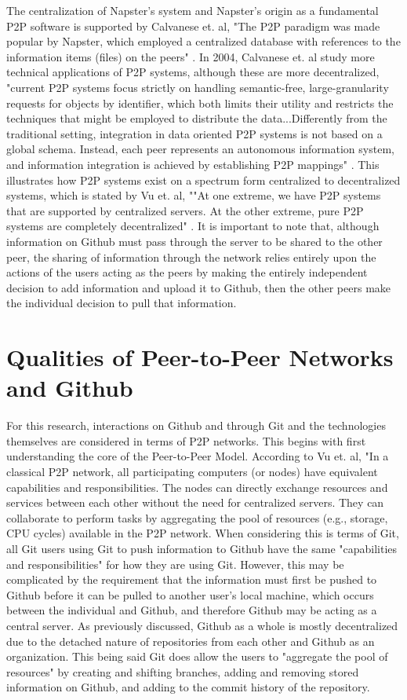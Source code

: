 The centralization of Napster's system and Napster's origin as a fundamental P2P software is supported by Calvanese et. al, "The P2P paradigm was made popular by Napster, which employed a centralized database with references to the information items (files) on the peers" \cite{calvanese2004logical}. In 2004, Calvanese et. al study more technical applications of P2P systems, although these are more decentralized, "current P2P systems focus strictly
on handling semantic-free, large-granularity requests for objects by identifier, which both limits their utility and restricts the techniques that might be employed to distribute the data...Differently from the traditional setting, integration in data oriented P2P systems is not based on a global schema. Instead, each peer represents an autonomous information system, and information integration is achieved by establishing P2P mappings" \cite{calvanese2004logical}. This illustrates how P2P systems exist on a spectrum form centralized to decentralized systems, which is stated by Vu et. al, ""At one extreme, we have P2P systems that are supported by centralized servers. At the other extreme, pure P2P systems are completely decentralized" \cite{peertopeercomputing}. It is important to note that, although information on Github must pass through the server to be shared to the other peer, the sharing of information through the network relies entirely upon the actions of the users acting as the peers by making the entirely independent decision to add information and upload it to Github, then the other peers make the individual decision to pull that information. 

\section{Qualities of Peer-to-Peer Networks and Github}

For this research, interactions on Github and through Git and the technologies themselves are considered in terms of P2P networks. This begins with first understanding the core of the Peer-to-Peer Model. According to Vu et. al, "In a classical P2P network, all
participating computers (or nodes) have equivalent capabilities and responsibilities.
The nodes can directly exchange resources and services between each other without
the need for centralized servers. They can collaborate to perform tasks by aggregating the pool of resources (e.g., storage, CPU cycles) available in the P2P network\cite{peertopeercomputing}. When considering this is terms of Git, all Git users using Git to push information to Github have the same "capabilities and responsibilities" for how they are using Git. However, this may be complicated by the requirement that the information must first be pushed to Github before it can be pulled to another user's local machine, which occurs between the individual and Github, and therefore Github may be acting as a central server. As previously discussed, Github as a whole is mostly decentralized due to the detached nature of repositories from each other and Github as an organization. This being said Git does allow the users to "aggregate the pool of resources" by creating and shifting branches, adding and removing stored information on Github, and adding to the commit history of the repository. 

